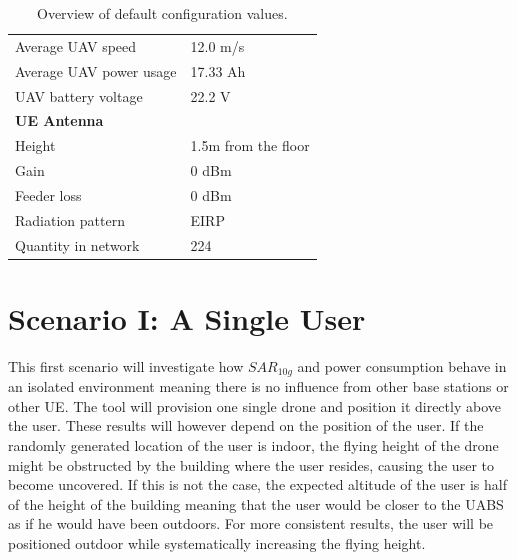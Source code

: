 \begin{table}[!htb]
\begin{tabular}[t]{ll}
        \hspace{3mm}  Average UAV speed                   & 12.0 m/s \\
        \hspace{3mm}  Average UAV power usage             & 17.33 Ah    \\
        \hspace{3mm}  UAV battery voltage                 & 22.2 V \\
        \hline
        \multicolumn{2}{l}{\textbf{\acs{UE} Antenna}} \\
        \hline 
        \hspace{3mm} Height                     & 1.5m from the floor       \\ 
        \hspace{3mm} Gain                      & 0 dBm   \\ 
        \hspace{3mm} Feeder loss               & 0 dBm   \\ 
        \hspace{3mm} Radiation pattern         & \acs{EIRP}  \\
        \hspace{3mm} Quantity in network                & 224  \\
        \toprule
\end{tabular}
\caption{Overview of default configuration values.}
\label{table:defaultconf}
\end{table}

\section{Scenario I: A Single User}
\label{sec:scenarios_s1}

This first scenario will investigate how $SAR_{10g}$ and power consumption behave in an isolated environment meaning there is no influence 
from other base stations or other \gls{UE}. The tool will provision one single drone and position it directly above the user.
These results will however depend on the position of the user. If the randomly generated location of the user is indoor, 
the flying height of the drone might be obstructed by the building where the user resides, causing the user to become uncovered. If this is not the case,
the expected altitude of the user is half of the height of the building meaning that the user would be closer to the \gls{UABS} as 
if he would have been outdoors. For more consistent results, the user will be positioned outdoor while systematically 
increasing the flying height. 

